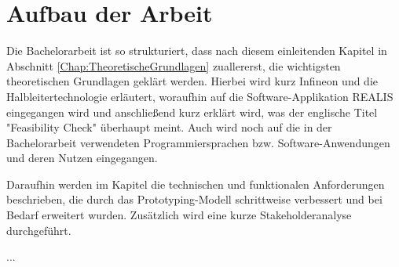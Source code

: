 \section{Aufbau der Arbeit}
Die Bachelorarbeit ist so strukturiert, dass nach diesem einleitenden Kapitel in Abschnitt \ref{Chap:TheoretischeGrundlagen} zuallererst, die wichtigsten theoretischen Grundlagen geklärt werden. 
Hierbei wird kurz Infineon und die Halbleitertechnologie erläutert, woraufhin auf die Software-Applikation \gls{REALIS} eingegangen wird und anschließend kurz erklärt wird, was der englische Titel "Feasibility Check" überhaupt meint. Auch wird noch auf die in der Bachelorarbeit verwendeten Programmiersprachen bzw. Software-Anwendungen und deren Nutzen eingegangen.

Daraufhin werden im Kapitel  die technischen und funktionalen Anforderungen beschrieben, die durch das Prototyping-Modell schrittweise verbessert und bei Bedarf erweitert wurden. Zusätzlich wird eine kurze Stakeholderanalyse durchgeführt.

...